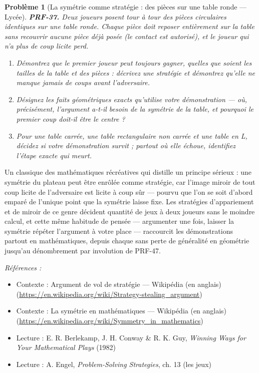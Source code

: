 \documentclass[11pt]{article}
\newtheorem{problem}{Problème}
\newenvironment{refs}{\par\small\noindent\emph{Références :}\begin{itemize}\setlength\itemsep{0pt}}{\end{itemize}\normalsize}
\begin{document}
\bigskip

\begin{problem}[{La symétrie comme stratégie : des pièces sur une table ronde --- Lycée}]
\textbf{PRF-37.} Deux joueurs posent tour à tour des pièces circulaires identiques sur
une table ronde. Chaque pièce doit reposer entièrement sur la table sans recouvrir aucune
pièce déjà posée (le contact est autorisé), et le joueur qui n'a plus de coup licite
perd.
\begin{enumerate}
\item[(a)] Démontrez que le premier joueur peut toujours gagner, quelles que soient les tailles
de la table et des pièces : décrivez une stratégie et démontrez qu'elle ne manque jamais
de coups avant l'adversaire.
\item[(b)] Désignez les faits géométriques exacts qu'utilise votre démonstration --- où,
précisément, l'argument a-t-il besoin de la symétrie de la table, et pourquoi le premier
coup doit-il être le centre ?
\item[(c)] Pour une table carrée, une table rectangulaire non carrée et une table en L, décidez
si votre démonstration survit ; partout où elle échoue, identifiez l'étape exacte qui
meurt.
\end{enumerate}

\end{problem}

\noindent Un classique des mathématiques récréatives qui distille un principe
sérieux : une symétrie du plateau peut être enrôlée comme stratégie, car l'image miroir de
tout coup licite de l'adversaire est licite à coup sûr --- pourvu que l'on se soit d'abord
emparé de l'unique point que la symétrie laisse fixe. Les stratégies d'appariement et de
miroir de ce genre décident quantité de jeux à deux joueurs sans le moindre calcul, et cette
même habitude de pensée --- argumenter une fois, laisser la symétrie répéter l'argument à
votre place --- raccourcit les démonstrations partout en mathématiques, depuis chaque \og{} sans
perte de généralité \fg{} en géométrie jusqu'au dénombrement par involution de PRF-47.

\begin{refs}
\item Contexte : Argument de vol de stratégie --- Wikipédia (en anglais) (\url{https://en.wikipedia.org/wiki/Strategy-stealing_argument})
\item Contexte : La symétrie en mathématiques --- Wikipédia (en anglais) (\url{https://en.wikipedia.org/wiki/Symmetry_in_mathematics})
\item Lecture : E. R. Berlekamp, J. H. Conway \& R. K. Guy, \textit{Winning Ways for Your Mathematical Plays} (1982)
\item Lecture : A. Engel, \textit{Problem-Solving Strategies}, ch. 13 (les jeux)
\end{refs}
\end{document}
